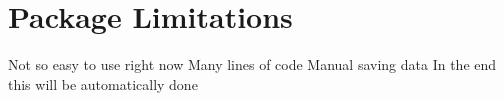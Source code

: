 \section{Package Limitations}
Not so easy to use right now
Many lines of code
Manual saving data
In the end this will be automatically done
